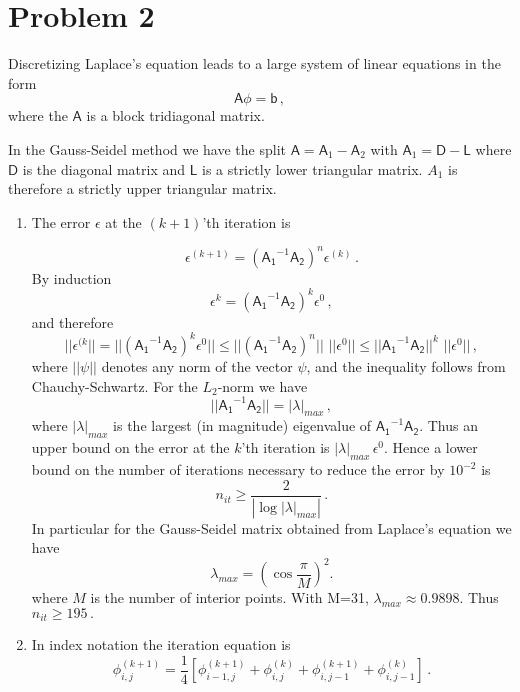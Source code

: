 \documentclass[11pt]{article}
\newcommand{\com}{\, ,}
\newcommand{\per}{\, .}
\def\beq{\begin{equation}}
\def\eeq{\end{equation}}
\newcommand{\ep}{\ensuremath {\epsilon}}
\begin{document}
\section*{Problem 2}


    Discretizing Laplace's equation leads to a large system of linear equations in the form
    \beq
        \label{lap_eqn}
        \mathsf{A}\mathsf{\phi} = \mathsf{b}\com
    \eeq
    where the $\mathsf{A}$ is a block tridiagonal matrix.  

    In the Gauss-Seidel method we have the split $\mathsf{A} = \mathsf{A}_1 - \mathsf{A}_2$ with $\mathsf{A}_1 = \mathsf{D} -\mathsf{L}$ where $\mathsf{D}$ is the diagonal matrix and $\mathsf{L}$ is a strictly lower triangular matrix. $A_1$ is therefore a strictly upper triangular matrix. 

\begin{enumerate}[label=(\alph*)]
    \item The error $\ep$ at the $(k+1)$'th iteration  is

        \beq
        \ep^{(k+1)} = \left(\mathsf{A_1}^{-1}\mathsf{A_2}\right)^n\ep^{(k)}\per
        \eeq
        By induction 
        \beq
        \ep^{k} = \left(\mathsf{A_1}^{-1}\mathsf{A_2}\right)^k\ep^0\com
        \eeq
        and therefore
        \beq
    ||\ep^{(k}|| = ||\left(\mathsf{A_1}^{-1}\mathsf{A_2}\right)^k\ep^0|| \leq ||\left(\mathsf{A_1}^{-1}\mathsf{A_2}\right)^n||\,\, ||\ep^0||\leq||\mathsf{A_1}^{-1}\mathsf{A_2}||^k\,\, ||\ep^0|| \com
        \eeq
        where $|| \mathsf{\psi} ||$ denotes any norm of the vector $\mathsf{\psi}$, and the inequality follows from Chauchy-Schwartz. For the $L_2$-norm we have
        \beq
        ||\mathsf{A_1}^{-1}\mathsf{A_2}|| = |\lambda|_{max}\com
        \eeq
        where $|\lambda|_{max}$ is the largest (in magnitude) eigenvalue of $\mathsf{A_1}^{-1}\mathsf{A_2}$. Thus an upper bound on the error at the $k$'th iteration is $|\lambda|_{max}\,\ep^0$. Hence a lower bound on the number of iterations necessary to reduce the error by $10^{-2}$ is
        \beq
        n_{it} \ge \frac{2}{|\log{|\lambda|_{max}}|}\per
        \eeq
        In particular for the Gauss-Seidel matrix obtained from Laplace's equation we have
        \beq
        \lambda_{max} = \left(\cos\frac{\pi}{M}\right)^2.
        \eeq
        where $M$ is the number of interior points. With M=31, $\lambda_{max} \approx 0.9898$. Thus $n_{it} \ge 195\per$

    \item In index notation the iteration equation is
        \beq
        \phi_{i,j}^{(k+1)} = \frac{1}{4}\left[\phi_{i-1,j}^{(k+1)}+\phi_{i,j}^{(k)}+\phi_{i,j-1}^{(k+1)}+\phi_{i,j-1}^{(k)}\right]\per
        \eeq


\end{enumerate}
\end{document}
